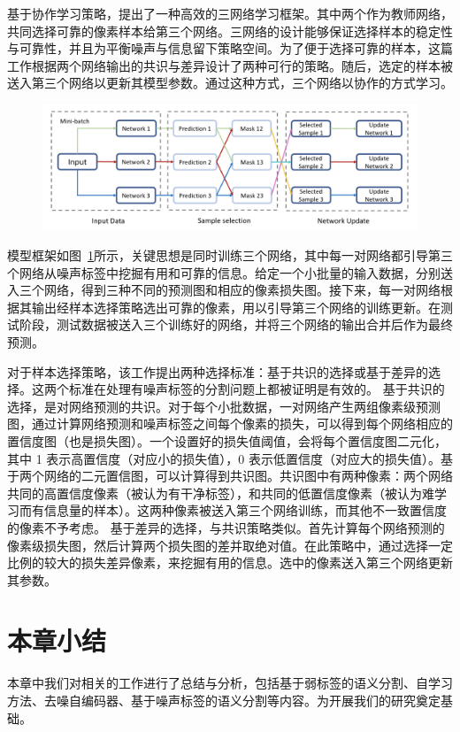 \citet{Zhang2020RobustMI} 基于协作学习策略，提出了一种高效的三网络学习框架。其中两个作为教师网络，共同选择可靠的像素样本给第三个网络。三网络的设计能够保证选择样本的稳定性与可靠性，并且为平衡噪声与信息留下策略空间。为了便于选择可靠的样本，这篇工作根据两个网络输出的共识与差异设计了两种可行的策略。随后，选定的样本被送入第三个网络以更新其模型参数。通过这种方式，三个网络以协作的方式学习。
    \begin{figure}[tbp]
        \centering 
        \includegraphics[width=1.0\textwidth]{img/c2/rel_c3.png}
        \label{c2_fig13}
    \end{figure}
模型框架如图~\ref{c2_fig13}所示，关键思想是同时训练三个网络，其中每一对网络都引导第三个网络从噪声标签中挖掘有用和可靠的信息。给定一个小批量的输入数据，分别送入三个网络，得到三种不同的预测图和相应的像素损失图。接下来，每一对网络根据其输出经样本选择策略选出可靠的像素，用以引导第三个网络的训练更新。在测试阶段，测试数据被送入三个训练好的网络，并将三个网络的输出合并后作为最终预测。

对于样本选择策略，该工作提出两种选择标准：基于共识的选择或基于差异的选择。这两个标准在处理有噪声标签的分割问题上都被证明是有效的。
基于共识的选择，是对网络预测的共识。对于每个小批数据，一对网络产生两组像素级预测图，通过计算网络预测和噪声标签之间每个像素的损失，可以得到每个网络相应的置信度图（也是损失图）。一个设置好的损失值阈值，会将每个置信度图二元化，其中 1 表示高置信度（对应小的损失值），0 表示低置信度（对应大的损失值）。基于两个网络的二元置信图，可以计算得到共识图。共识图中有两种像素：两个网络共同的高置信度像素（被认为有干净标签），和共同的低置信度像素（被认为难学习而有信息量的样本）。这两种像素被送入第三个网络训练，而其他不一致置信度的像素不予考虑。
基于差异的选择，与共识策略类似。首先计算每个网络预测的像素级损失图，然后计算两个损失图的差并取绝对值。在此策略中，通过选择一定比例的较大的损失差异像素，来挖掘有用的信息。选中的像素送入第三个网络更新其参数。


\section{本章小结}
本章中我们对相关的工作进行了总结与分析，包括基于弱标签的语义分割、自学习方法、去噪自编码器、基于噪声标签的语义分割等内容。为开展我们的研究奠定基础。

